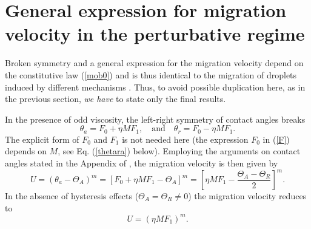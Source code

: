 \documentclass[%
 amsmath,amssymb,
 aps,
10.5pt]{revtex4-2}
\def\rr#1{(\ref{#1})}
\newcommand{\be}{\begin{equation}}
\newcommand{\ee}{\end{equation}}
\begin{document}
\section{\label{generalF}General expression for migration velocity in the perturbative regime}
Broken symmetry and a general expression for the migration velocity 
depend on the constitutive law \rr{mob0} and is thus identical to the migration of droplets
induced by different mechanisms \cite[Appendix B]{Aggarwal2023}. Thus, to avoid 
possible duplication here, as in the previous section, \emph{we have} to state only the final results. 


In the presence of odd viscosity, the left-right symmetry of contact angles breaks
\be \label{F}
\theta_a= F_0 +\eta M F_1, \quad \textrm{and} 
\quad
\theta_r= F_0 - \eta MF_1. 
\ee
The explicit form of $F_0$ and $F_1$ is not needed 
here {(the expression $F_0$ in \rr{F} depends on $M$, see Eq. \rr{thetara} below).}
Employing the arguments on contact angles stated in the Appendix of \cite{Aggarwal2023}, 
the migration velocity is then given by 
\be \label{UAR}
U = (\theta_a - \Theta_A)^m =\left[ F_0 + \eta M F_1 - \Theta_A\right]^m = \left[\eta M  F_1 - \frac{\Theta_A-\Theta_R}{2}\right]^m.
\ee
In the absence of hysteresis effects ($\Theta_A = \Theta_R \neq 0$) the migration velocity reduces to 
\be \label{U}
U = \left(\eta M F_1\right)^m. 
\ee
\end{document}
